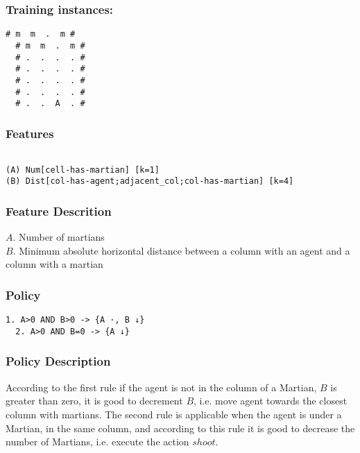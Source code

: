 \documentclass[a4paper]{article}
\begin{document}
\subsubsection{Training instances:}
\begin{Verbatim}[fontsize=\footnotesize]
  # m  m  .  m #
  # m  m  .  m #
  # .  .  .  . #
  # .  .  .  . #
  # .  .  .  . #
  # .  .  .  . #
  # .  .  A  . #
\end{Verbatim}

\subsubsection{Features}
\begin{Verbatim}[fontsize=\footnotesize]

(A) Num[cell-has-martian] [k=1]
(B) Dist[col-has-agent;adjacent_col;col-has-martian] [k=4]
\end{Verbatim}

\subsubsection{Feature Descrition}
$A$. Number of martians\\
$B$. Minimum absolute horizontal distance between a column with an agent and a column with a martian

\subsubsection{Policy}
\begin{Verbatim}[fontsize=\footnotesize]
  1. A>0 AND B>0 -> {A ·, B ↓}
  2. A>0 AND B=0 -> {A ↓}
\end{Verbatim}

\subsubsection{Policy Description}
According to the first rule if the agent is not in the column of a Martian, $B$ is greater than zero, it is good to decrement $B$, i.e. move agent towards the closest column with martians. The second rule is applicable when the agent is under a Martian, in the same column, and according to this rule it is good to decrease the number of Martians, i.e. execute the action $shoot$.
\end{document}
